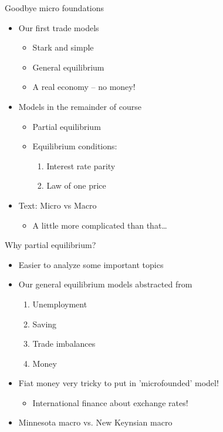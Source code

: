 \documentclass{beamer}
\begin{document}
\begin{frame}{Goodbye micro foundations}

    \begin{itemize}
        \item Our first trade models
        \begin{itemize}
            \item Stark and simple
            \item General equilibrium
            \item A real economy -- no money!
        \end{itemize}
        \item Models in the remainder of course
        \begin{itemize}
            \item Partial equilibrium
            \item Equilibrium conditions:
            \begin{enumerate}
                \item Interest rate parity
                \item Law of one price
            \end{enumerate}
        \end{itemize}
        \item Text: Micro vs Macro
        \begin{itemize}
            \item A little more complicated than that\dots
        \end{itemize}
    \end{itemize}

\end{frame}

\begin{frame}{Why partial equilibrium?}

    \begin{itemize}
        \item Easier to analyze some important topics
        \item Our general equilibrium models abstracted from
        \begin{enumerate}
            \item Unemployment
            \item Saving
            \item Trade imbalances
            \item Money
        \end{enumerate}
        \item Fiat money very tricky to put in 'microfounded' model!
        \begin{itemize}
            \item International finance about exchange rates!
        \end{itemize}
        \item Minnesota macro vs. New Keynsian macro
    \end{itemize}

\end{frame}
\end{document}
